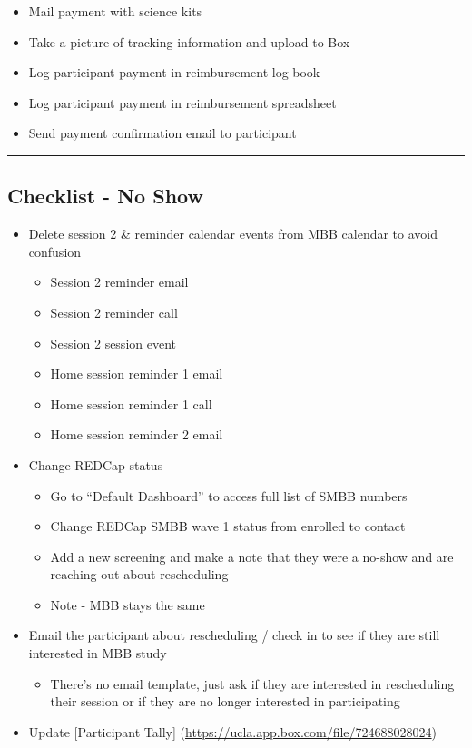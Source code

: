 \documentclass[]{book}
\providecommand{\tightlist}{%
  \setlength{\itemsep}{0pt}\setlength{\parskip}{0pt}}
\begin{document}
\begin{itemize}
\tightlist
\item
  Mail payment with science kits
\item
  Take a picture of tracking information and upload to Box
\item
  Log participant payment in reimbursement log book
\item
  Log participant payment in reimbursement spreadsheet
\item
  Send payment confirmation email to participant
\end{itemize}

\begin{center}\rule{0.5\linewidth}{0.5pt}\end{center}

\hypertarget{checklist---no-show}{%
\subsection{Checklist - No Show}\label{checklist---no-show}}

\begin{itemize}
\tightlist
\item
  Delete session 2 \& reminder calendar events from MBB calendar to avoid confusion

  \begin{itemize}
  \tightlist
  \item
    Session 2 reminder email
  \item
    Session 2 reminder call
  \item
    Session 2 session event
  \item
    Home session reminder 1 email
  \item
    Home session reminder 1 call
  \item
    Home session reminder 2 email
  \end{itemize}
\item
  Change REDCap status

  \begin{itemize}
  \tightlist
  \item
    Go to ``Default Dashboard'' to access full list of SMBB numbers
  \item
    Change REDCap SMBB wave 1 status from enrolled to contact
  \item
    Add a new screening and make a note that they were a no-show and are reaching out about rescheduling
  \item
    Note - MBB stays the same
  \end{itemize}
\item
  Email the participant about rescheduling / check in to see if they are still interested in MBB study

  \begin{itemize}
  \tightlist
  \item
    There's no email template, just ask if they are interested in rescheduling their session or if they are no longer interested in participating
  \end{itemize}
\item
  Update {[}Participant Tally{]} (\url{https://ucla.app.box.com/file/724688028024})
\end{itemize}
\end{document}
